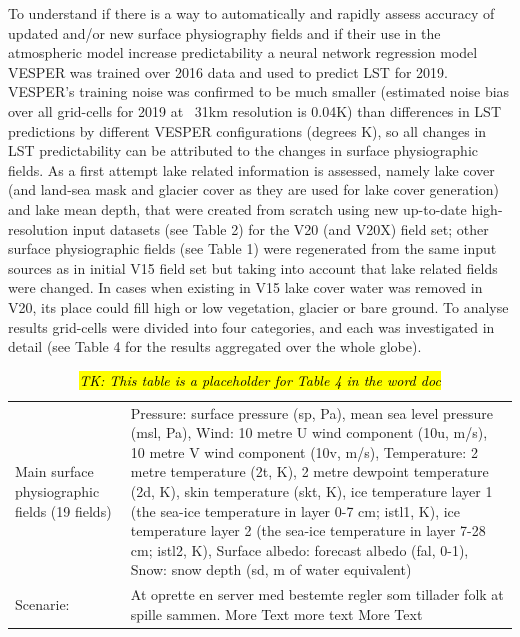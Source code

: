 \documentclass[hess, manuscript]{copernicus}
\begin{document}
To understand if there is a way to automatically and rapidly assess accuracy of updated and/or new surface physiography fields and if their use in the atmospheric model increase predictability a neural network regression model VESPER was trained over 2016 data and used to predict LST for 2019. VESPER’s training noise was confirmed to be much smaller (estimated noise bias over all grid-cells for 2019 at ~31km resolution is 0.04K) than differences in LST predictions by different VESPER configurations (degrees K), so all changes in LST predictability can be attributed to the changes in surface physiographic fields. As a first attempt lake related information is assessed, namely lake cover (and land-sea mask and glacier cover as they are used for lake cover generation) and lake mean depth, that were created from scratch using new up-to-date high-resolution input datasets (see Table 2) for the V20 (and V20X) field set; other surface physiographic fields (see Table 1) were regenerated from the same input sources as in initial V15 field set but taking into account that lake related fields were changed. In cases when existing in V15 lake cover water was removed in V20, its place could fill high or low vegetation, glacier or bare ground. To analyse results grid-cells were divided into four categories, and each was investigated in detail (see Table 4 for the results aggregated over the whole globe).




\begin{table}[h]
	\begin{tabularx}{\textwidth}{lX}
		\hline
		Main surface physiographic fields
		(19 fields)          & Pressure: surface pressure (sp, Pa), mean sea level pressure (msl, Pa), 
		Wind: 10 metre U wind component (10u, m/s), 10 metre V wind component (10v, m/s), 
		Temperature: 2 metre temperature (2t, K), 2 metre dewpoint temperature (2d, K), skin temperature (skt, K), ice temperature layer 1 (the sea-ice temperature in layer 0-7 cm; istl1, K), ice temperature layer 2 (the sea-ice temperature in layer 7-28 cm; istl2, K), 
		Surface albedo: forecast albedo (fal, 0-1), 
		Snow: snow depth (sd, m of water equivalent)
		
		\\
		Scenarie:               & At oprette en server med bestemte regler som tillader folk at spille sammen. More Text more text More Text \\
		\hline
	\end{tabularx}
	\caption{\hl{\textit{TK: This table is a placeholder for Table 4 in the word doc}}}
\end{table}
\end{document}

